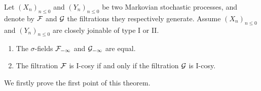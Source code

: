 \documentclass[12pt,a4paper]{article}
\begin{document}
\begin{thm}\label{thm:joinable}
Let ${(X_n)}_{n \leq 0}$ and ${(Y_n)}_{n \leq 0}$ be two Markovian stochastic processes, and 
denote by $\mathcal{F}$ and $\mathcal{G}$ the filtrations they respectively generate. 
Assume ${(X_n)}_{n \leq 0}$ and ${(Y_n)}_{n \leq 0}$ are closely joinable of type I or II. 
\begin{enumerate}
\item The $\sigma$-fields $\mathcal{F}_{-\infty}$  and $\mathcal{G}_{-\infty}$ are equal. 

\item The filtration $\mathcal{F}$ is I-cosy if and only if the filtration $\mathcal{G}$ is I-cosy.
\end{enumerate}
\end{thm}

We firstly prove the first point of this theorem. 
\end{document}
